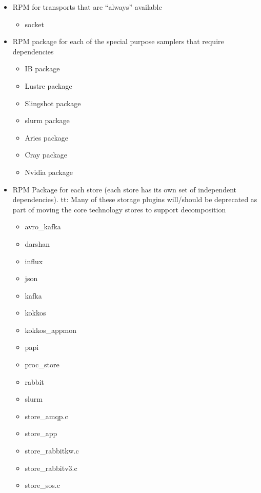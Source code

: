 \documentclass{article}
\begin{document}
\begin{itemize}
\begin{itemize}
\begin{itemize}
                \end{itemize}
        \end{itemize}
    \item RPM for transports that are “always” available
        \begin{itemize}
            \item socket
        \end{itemize}
    \item RPM package for each of the special purpose samplers that require dependencies
        \begin{itemize}
            \item IB package
            \item Lustre package
            \item Slingshot package
            \item slurm package
            \item Aries package
            \item Cray package
            \item Nvidia package
        \end{itemize}
    \item RPM Package for each store (each store has its own set of independent dependencies). tt: Many of these storage plugins will/should be deprecated as part of moving the core technology stores to support decomposition
        \begin{itemize}
            \item avro\_kafka
            \item darshan
            \item influx
            \item json
            \item kafka
            \item kokkos
            \item kokkos\_appmon
            \item papi
            \item proc\_store
            \item rabbit
            \item slurm
            \item store\_amqp.c
            \item store\_app
            \item store\_rabbitkw.c
            \item store\_rabbitv3.c
            \item store\_sos.c

\end{itemize}
\end{itemize}
\end{document}
